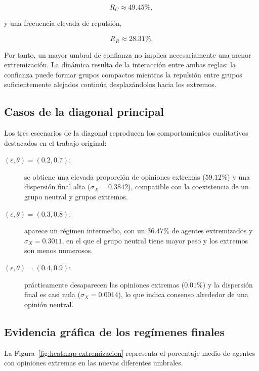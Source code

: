 \documentclass[11pt,a4paper]{article}
\begin{document}
\begin{equation}
R_C \approx 49.45\%,
\end{equation}

y una frecuencia elevada de repulsión,

\begin{equation}
R_R \approx 28.31\%.
\end{equation}

Por tanto, un mayor umbral de confianza no implica necesariamente una menor extremización. La dinámica resulta de la interacción entre ambas reglas: la confianza puede formar grupos compactos mientras la repulsión entre grupos suficientemente alejados continúa desplazándolos hacia los extremos.

\subsection{Casos de la diagonal principal}

Los tres escenarios de la diagonal reproducen los comportamientos cualitativos destacados en el trabajo original:

\begin{description}
    \item[$(\epsilon,\theta)=(0.2,0.7)$:] se obtiene una elevada proporción de opiniones extremas ($59.12\%$) y una dispersión final alta ($\sigma_X=0.3842$), compatible con la coexistencia de un grupo neutral y grupos extremos.

    \item[$(\epsilon,\theta)=(0.3,0.8)$:] aparece un régimen intermedio, con un $36.47\%$ de agentes extremizados y $\sigma_X=0.3011$, en el que el grupo neutral tiene mayor peso y los extremos son menos numerosos.

    \item[$(\epsilon,\theta)=(0.4,0.9)$:] prácticamente desaparecen las opiniones extremas ($0.01\%$) y la dispersión final es casi nula ($\sigma_X=0.0014$), lo que indica consenso alrededor de una opinión neutral.
\end{description}

\subsection{Evidencia gráfica de los regímenes finales}

La Figura~\ref{fig:heatmap-extremizacion} representa el porcentaje medio de agentes con opiniones extremas en las nuevas diferentes umbrales.
\end{document}
